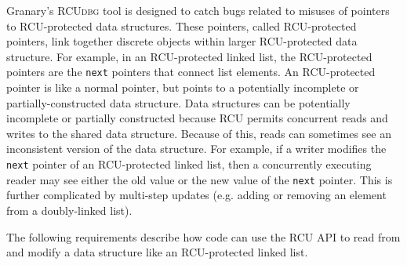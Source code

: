 \documentclass[preprint]{sigplanconf}
\newcommand{\toolname}[1]{{\scshape #1}}
\begin{document}

Granary's \toolname{RCUdbg} tool is designed to catch bugs related to misuses of pointers to RCU-protected data structures. These pointers, called RCU-protected pointers, link together discrete objects within larger RCU-protected data structure. For example, in an RCU-protected linked list, the RCU-protected pointers are the \texttt{next} pointers that connect list elements. An RCU-protected pointer is like a normal pointer, but points to a potentially incomplete or partially-constructed data structure. Data structures can be potentially incomplete or partially constructed because RCU permits concurrent reads and writes to the shared data structure. Because of this, reads can sometimes see an inconsistent version of the data structure. For example, if a writer modifies the \texttt{next} pointer of an RCU-protected linked list, then a concurrently executing reader may see either the old value or the new value of the \texttt{next} pointer. This is further complicated by multi-step updates (e.g. adding or removing an element from a doubly-linked list). %

%
%
The following requirements describe how code can use the RCU API to read from and modify a data structure like an RCU-protected linked list.

\end{document}

